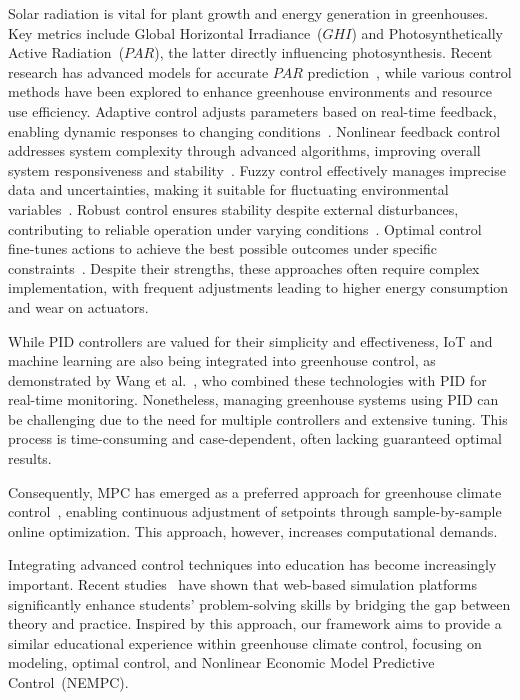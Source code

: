 \documentclass[conference]{IEEEtran}
\begin{document}
Solar radiation is vital for plant growth and energy generation in greenhouses. Key metrics include Global Horizontal Irradiance~(\(GHI\)) and Photosynthetically Active Radiation~(\(PAR\)), the latter directly influencing photosynthesis. Recent research has advanced models for accurate \(PAR\) prediction~\cite{Iddio2020, MaLu2022}, while various control methods have been explored to enhance greenhouse environments and resource use efficiency. Adaptive control adjusts parameters based on real-time feedback, enabling dynamic responses to changing conditions~\cite{Tian2022}. Nonlinear feedback control addresses system complexity through advanced algorithms, improving overall system responsiveness and stability~\cite{Bood2023}. Fuzzy control effectively manages imprecise data and uncertainties, making it suitable for fluctuating environmental variables~\cite{smartcities7030055}. Robust control ensures stability despite external disturbances, contributing to reliable operation under varying conditions~\cite{Zhang2021}. Optimal control fine-tunes actions to achieve the best possible outcomes under specific constraints~\cite{Debroy2024, SVENSEN2024108578}. Despite their strengths, these approaches often require complex implementation, with frequent adjustments leading to higher energy consumption and wear on actuators.

While PID controllers are valued for their simplicity and effectiveness, IoT and machine learning are also being integrated into greenhouse control, as demonstrated by Wang et al.~\cite{Wang2024}, who combined these technologies with PID for real-time monitoring. Nonetheless, managing greenhouse systems using PID can be challenging due to the need for multiple controllers and extensive tuning. This process is time-consuming and case-dependent, often lacking guaranteed optimal results.

Consequently, MPC has emerged as a preferred approach for greenhouse climate control~\cite{Hu2022}, enabling continuous adjustment of setpoints through sample-by-sample online optimization. This approach, however, increases computational demands.

Integrating advanced control techniques into education has become increasingly important. Recent studies~\cite{WangEducation2024, Zakova2024} have shown that web-based simulation platforms significantly enhance students' problem-solving skills by bridging the gap between theory and practice. Inspired by this approach, our framework aims to provide a similar educational experience within greenhouse climate control, focusing on modeling, optimal control, and Nonlinear Economic Model Predictive Control~(NEMPC).
\end{document}
